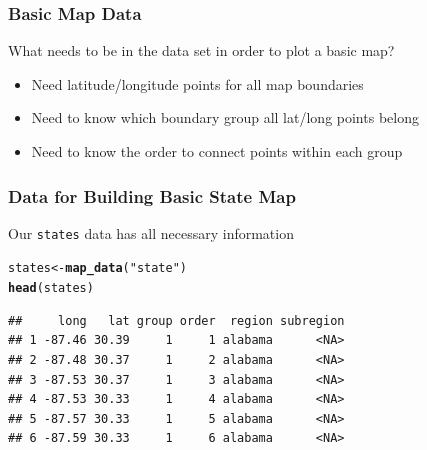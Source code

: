 \documentclass{beamer}\usepackage[]{graphicx}\usepackage[]{color}
\makeatletter
\newcommand{\hlstr}[1]{\textcolor[rgb]{0.192,0.494,0.8}{#1}}%
\newcommand{\hlstd}[1]{\textcolor[rgb]{0.345,0.345,0.345}{#1}}%
\newcommand{\hlkwb}[1]{\textcolor[rgb]{0.69,0.353,0.396}{#1}}%
\newcommand{\hlkwd}[1]{\textcolor[rgb]{0.737,0.353,0.396}{\textbf{#1}}}%
\newenvironment{kframe}{%
 \def\at@end@of@kframe{}%
 \ifinner\ifhmode%
  \def\at@end@of@kframe{\end{minipage}}%
  \begin{minipage}{\columnwidth}%
 \fi\fi%
 \def\FrameCommand##1{\hskip\@totalleftmargin \hskip-\fboxsep
 \colorbox{shadecolor}{##1}\hskip-\fboxsep
     \hskip-\linewidth \hskip-\@totalleftmargin \hskip\columnwidth}%
 \MakeFramed {\advance\hsize-\width
   \@totalleftmargin\z@ \linewidth\hsize
   \@setminipage}}%
 {\par\unskip\endMakeFramed%
 \at@end@of@kframe}
\newenvironment{knitrout}{}{} %
\makeatother
\begin{document}

\begin{frame}
    \frametitle{Basic Map Data}
  What needs to be in the data set in order to plot a basic map?
    \begin{itemize}
        \item Need latitude/longitude points for all map boundaries
        \item Need to know which boundary group all lat/long points belong
        \item Need to know the order to connect points within each group
    \end{itemize}    
\end{frame}


\begin{frame}[fragile]
    \frametitle{Data for Building Basic State Map}
    
 Our \texttt{states} data has all necessary information
    
    \small
\begin{knitrout}\footnotesize
{}\color{fgcolor}\begin{kframe}
\begin{alltt}
\hlstd{states} \hlkwb{<-} \hlkwd{map_data}\hlstd{(}\hlstr{"state"}\hlstd{)}
\hlkwd{head}\hlstd{(states)}
\end{alltt}
\begin{verbatim}
##     long   lat group order  region subregion
## 1 -87.46 30.39     1     1 alabama      <NA>
## 2 -87.48 30.37     1     2 alabama      <NA>
## 3 -87.53 30.37     1     3 alabama      <NA>
## 4 -87.53 30.33     1     4 alabama      <NA>
## 5 -87.57 30.33     1     5 alabama      <NA>
## 6 -87.59 30.33     1     6 alabama      <NA>
\end{verbatim}
\end{kframe}
\end{knitrout}

    \normalsize
\end{frame}


\end{document}
